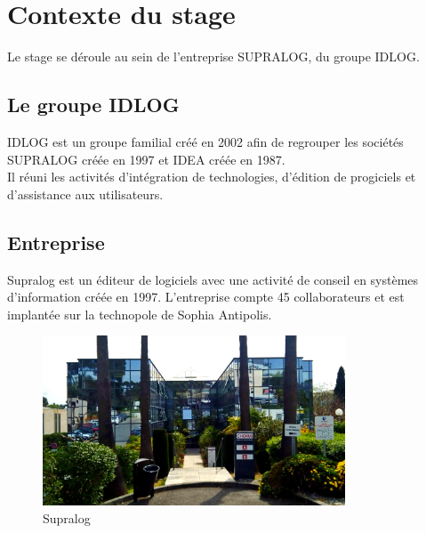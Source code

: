 \newpage

\section{Contexte du stage} %
Le stage se déroule au sein de l'entreprise SUPRALOG, du groupe IDLOG.

\subsection{Le groupe IDLOG}
\gls{IDLOG} est un groupe familial créé en 2002 afin de regrouper les sociétés \gls{SUPRALOG} créée en 1997 et \gls{IDEA} créée en 1987.\\
Il réuni les activités d'intégration de technologies, d’édition de progiciels et d'assistance aux utilisateurs.

\subsection{Entreprise}
Supralog est un éditeur de logiciels avec une activité de conseil en systèmes d'information créée en 1997.
L'entreprise compte 45 collaborateurs et est implantée sur la technopole de Sophia Antipolis.

\begin{figure}[H]
  \centering
  \includegraphics[width=9cm]{./img/supralog_building_3}
  \caption{\label{fig:mb_va_ast} Supralog}
\end{figure}


